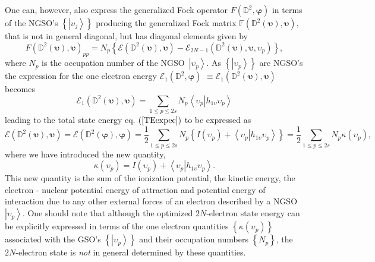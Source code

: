 \documentclass[aps,preprint]{revtex4}%
\begin{document}
One can, however, also express the generalized Fock operator $F\left(
\mathbb{D}^{2},\bm{\varphi}\right)  $ in terms of the NGSO's $\left\{
\left\vert \upsilon_{j}\right\rangle \right\}  $ producing the generalized
Fock matrix $\mathbb{F}\left(  \mathbb{D}^{2}\left(  \bm{\upsilon}\right)
,\bm{\upsilon}\right)  ,$ that is not in general diagonal, but has diagonal
elements given by
\begin{equation}
F\left(  \mathbb{D}^{2}\left(  \bm{\upsilon}\right)  ,\bm{\upsilon }\right)
_{pp}=N_{p}\left\{  \mathcal{E}\left(  \mathbb{D}^{2}\left(
\bm{\upsilon}\right)  ,\bm{\upsilon}\right)  -\mathcal{E}_{2N-1}\left(
\mathbb{D}^{2}\left(  \bm{\upsilon}\right)  ,\bm{\upsilon,}\upsilon
_{p}\right)  \right\}  ,
\end{equation}
where $N_{p}$ is the occupation number of the NGSO\ $\left\vert \upsilon
_{p}\right\rangle $. As $\left\{  \left\vert \upsilon_{p}\right\rangle
\right\}  $ are NGSO's the expression for the one electron energy
$\mathcal{E}_{1}\left(  \mathbb{D}^{2},\bm{\varphi}\right)  $ $\equiv
\mathcal{E}_{1}\left(  \mathbb{D}^{2}\left(  \bm{\upsilon}\right)
,\bm{\upsilon}\right)  $ becomes%
\begin{equation}
\mathcal{E}_{1}\left(  \mathbb{D}^{2}\left(  \bm{\upsilon}\right)
,\bm{\upsilon}\right)  =\sum_{1\leq p\leq2s}N_{p}\left\langle \left.
\upsilon_{p}\right\vert h_{1\upsilon}\upsilon_{p}\right\rangle
\end{equation}
leading to the total state energy eq. $\left(  \ref{TEexpec}\right)  $ to be
expressed as
\begin{equation}
\mathcal{E}\left(  \mathbb{D}^{2}\left(  \bm{\upsilon}\right)
,\bm{\upsilon}\right)  =\mathcal{E}\left(  \mathbb{D}^{2}\left(
\bm{\varphi}\right)  ,\bm{\varphi}\right)  =\frac{1}{2}\sum_{1\leq p\leq
2s}N_{p}\left\{  I\left(  \upsilon_{p}\right)  +\left\langle \left.
\upsilon_{p}\right\vert h_{1\upsilon}\upsilon_{p}\right\rangle \right\}
=\frac{1}{2}%
{\textstyle\sum\limits_{1\leq p\leq2s}}
N_{p}\kappa\left(  \upsilon_{p}\right)  , \label{Enkappa}%
\end{equation}
where we have introduced the new quantity,
\begin{equation}
\kappa\left(  \upsilon_{p}\right)  =I\left(  \upsilon_{p}\right)
+\left\langle \left.  \upsilon_{p}\right\vert h_{1\upsilon}\upsilon
_{p}\right\rangle . \label{kappa}%
\end{equation}
This new quantity is the sum of the ionization potential, the kinetic energy,
the electron - nuclear potential energy of attraction and potential energy of
interaction due to any other external forces of an electron described by a
NGSO\ $\left\vert \upsilon_{p}\right\rangle $. One should note that although
the optimized $2N$-electron state energy can be explicitly expressed in terms
of the one electron quantities $\left\{  \kappa\left(  \upsilon_{p}\right)
\right\}  $ associated with the GSO's $\left\{  \left\vert \upsilon
_{p}\right\rangle \right\}  $ and their occupation numbers $\left\{
N_{p}\right\}  $, the $2N$-electron state is \emph{not }in general determined
by these quantities.
\end{document}
